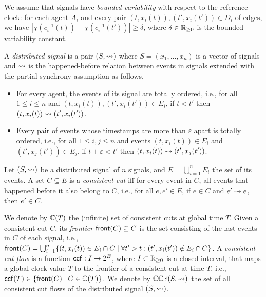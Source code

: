 We assume that signals have \emph{bounded variability} with respect to the reference clock: for each agent $A_i$ and every pair $(t, x_i(t)), (t', x_i(t')) \in D_i$ of edges, we have $|\chi(c_i^{-1}(t)) - \chi(c_i^{-1}(t'))| \geq \delta$, where $\delta \in \mathbb{R}_{\geq 0}$ is the bounded variability constant.


\begin{definition}
	A \emph{distributed signal} is a pair $(S, {\rightsquigarrow})$ where $S = (x_1, \ldots, x_n)$ is a vector of signals and ${\rightsquigarrow}$ is the happened-before relation between events in signals extended with the partial synchrony assumption as follows.
	\begin{itemize}
		\item For every agent, the events of its signal are totally ordered, i.e., for all $1 \leq i \leq n$ and $(t, x_i(t)), (t', x_i(t')) \in E_i$, if $t < t'$ then $(t, x_i(t)) \rightsquigarrow (t', x_i(t'))$.
		\item Every pair of events whose timestamps are more than $\varepsilon$ apart is totally ordered, i.e., for all $1 \leq i,j \leq n$ and events $(t, x_i(t)) \in E_i$ and $(t', x_j(t')) \in E_j$, if $t + \varepsilon < t'$ then $(t, x_i(t)) \rightsquigarrow (t', x_j(t'))$. %
	\end{itemize}
\end{definition}

\begin{example}
	\TODO
\end{example}

\begin{definition}
	Let $(S, {\rightsquigarrow})$ be a distributed signal of $n$ signals, and $E = \bigcup_{i = 1}^{n} E_i$ the set of its events.
	A set $C \subseteq E$ is a \emph{consistent cut} iff for every event in $C$, all events that happened before  it also belong to $C$, i.e., for all $e, e' \in E$, if $e \in C$ and $e' \rightsquigarrow e$, then $e' \in C$.
\end{definition}

We denote by $\mathbb{C}(T)$ the (infinite) set of consistent cuts at global time $T$.
Given a consistent cut $C$, its \emph{frontier} $\mathsf{front}(C) \subseteq C$ is the set consisting of the last events in $C$ of each signal, i.e., $\fr(C) = \bigcup_{i = 1}^{n} \{ (t, x_i(t)) \in E_i \cap C \st \forall t' > t : (t', x_i(t')) \notin E_i \cap C \}$.
A \emph{consistent cut flow} is a function $\mathsf{ccf} : I \to 2^E$, where $I \subset \mathbb{R}_{\geq 0}$ is a closed interval, that maps a global clock value $T$ to the frontier of a consistent cut at time $T$, i.e., $\ccf(T) \in \{\fr(C) \st C \in \CC(T)\}$.
We denote by $\mathbb{CCF}(S,{\rightsquigarrow})$ the set of all consistent cut flows of the distributed signal $(S,{\rightsquigarrow})$.

